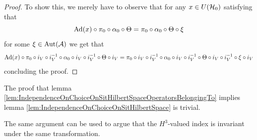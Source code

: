 \documentclass[11pt,a4paper,twoside]{article}
\numberwithin{equation}{section}
\begin{document}
	\begin{proof}
		To show this, we merely have to observe that for any $x\in U(\mathcal H_0)$ satisfying that
		\begin{equation}
			\Ad{x}\circ\pi_0\circ\alpha_0\circ\Theta =\pi_0\circ\alpha_0\circ\Theta\circ\xi
		\end{equation}
		for some $\xi\in\Aut{\AA}$ we get that
		\begin{equation}
			\Ad{x}\circ\pi_0\circ i_V\circ i_V^{-1}\circ\alpha_0\circ i_V\circ i_V^{-1}\circ\Theta\circ i_V =\pi_0\circ i_V\circ i_V^{-1}\circ\alpha_0\circ i_V\circ i_V^{-1}\circ\Theta\circ i_V\circ i_V^{-1}\circ\xi\circ i_V
		\end{equation}
		concluding the proof.
	\end{proof}
	The proof that lemma \ref{lem:IndependenceOnChoiceOnSitHilbertSpaceOperatorsBelongingTo} implies lemma \ref{lem:IndependenceOnChoiceOnSitHilbertSpace} is trivial.
	\begin{remark}\label{rem:OnSiteUnitaryTransformationH3ValuedIndex}
		The same argument can be used to argue that the $H^3$-valued index is invariant under the same transformation.
	\end{remark}
\end{document}
